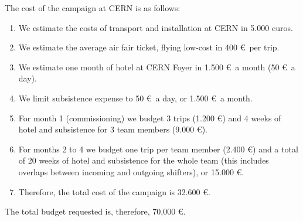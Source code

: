 The cost of the campaign at CERN is as follows: 
\begin{enumerate}
\item We estimate the costs of transport and installation at CERN in 5.000 euros.
\item We estimate the average air fair ticket, flying low-cost in 400 \euro\ per trip. 
\item We estimate one month of hotel at CERN Foyer in 1.500 \euro\ a month (50 \euro\ a day).
\item We limit subsistence expense to 50 \euro\ a day, or 1.500 \euro\ a month.
\item For month 1 (commissioning) we budget 3 trips (1.200 \euro) and 4 weeks of hotel and subsistence for 3 team members (9.000 \euro). 
\item For months 2 to 4 we budget one trip per team member (2.400 \euro) and a total of 20 weeks of hotel and subsistence for the whole team (this includes overlaps between incoming and outgoing shifters), or 15.000 \euro.
\item Therefore, the total cost of the campaign is 32.600 \euro.
\end{enumerate}

The total budget requested is, therefore, 70,000 \euro. 


